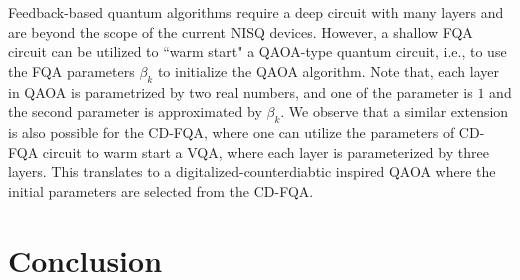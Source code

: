 \documentclass[twocolumn,aps,superscriptaddress,floatfix,longbibliography]{revtex4-2}
\def\YX{\ensuremath{\mathit{YX}}\xspace} %
\def\YZ{\ensuremath{\mathit{YZ}}\xspace}
\def\XX{\ensuremath{\mathit{XX}}\xspace}
\begin{document}

 Feedback-based quantum algorithms require a deep circuit with many layers and are beyond the scope of the current NISQ devices. However, a shallow FQA circuit can be utilized to ``warm start" a QAOA-type quantum circuit, i.e., to use the FQA parameters $\beta_{k}$ to initialize the QAOA algorithm. Note that, each layer in QAOA is parametrized by two real numbers, and one of the parameter is $1$ and the second parameter is approximated by $\beta_{k}$. 
 We observe that a similar extension is also possible for the CD-FQA, where one can utilize the parameters of CD-FQA circuit to warm start a VQA, where each layer is parameterized by three layers. This translates to a digitalized-counterdiabtic inspired QAOA \cite{chandarana2022digitized} where the initial parameters are selected from the CD-FQA.    

\section{Conclusion}
\label{sec:conclusion}
\end{document}
